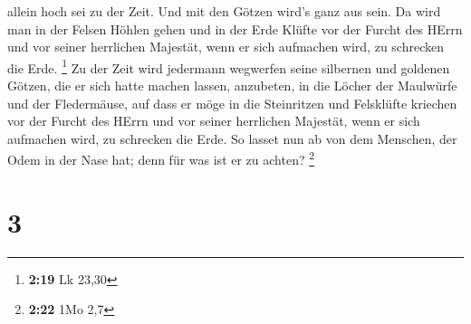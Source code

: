 allein hoch sei zu der Zeit.  Und mit den Götzen wird's
ganz aus sein.  Da wird man in der Felsen Höhlen gehen und
in der Erde Klüfte vor der Furcht des HErrn und vor seiner herrlichen
Majestät, wenn er sich aufmachen wird, zu schrecken die Erde.
\footnote{\textbf{2:19} Lk 23,30}  Zu der Zeit wird
jedermann wegwerfen seine silbernen und goldenen Götzen, die er sich
hatte machen lassen, anzubeten, in die Löcher der Maulwürfe und der
Fledermäuse,  auf dass er möge in die Steinritzen und
Felsklüfte kriechen vor der Furcht des HErrn und vor seiner herrlichen
Majestät, wenn er sich aufmachen wird, zu schrecken die Erde.
 So lasset nun ab von dem Menschen, der Odem in der Nase
hat; denn für was ist er zu achten? \footnote{\textbf{2:22} 1Mo 2,7}

\hypertarget{section-1}{%
\section{3}\label{section-1}}

